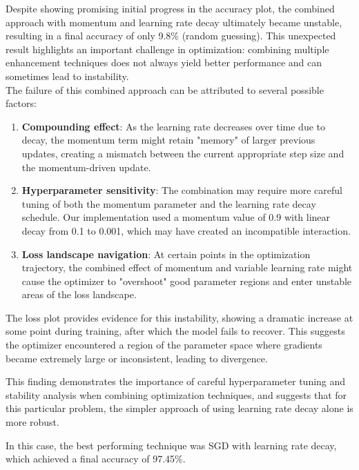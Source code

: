 \documentclass{article}
\begin{document}
\noindent Despite showing promising initial progress in the accuracy plot, the 
combined approach with momentum and learning rate decay ultimately became unstable,
resulting in a final accuracy of only 9.8\% (random guessing). 
This unexpected result highlights an important challenge in optimization: combining 
multiple enhancement techniques does not always yield better performance and can sometimes lead to instability. \\

\noindent The failure of this combined approach can be attributed to several possible factors:

\begin{enumerate}
    \item \textbf{Compounding effect}: As the learning rate decreases over time due to decay, the momentum term might retain "memory" of larger previous updates, creating a mismatch between the current appropriate step size and the momentum-driven update.
    
    \item \textbf{Hyperparameter sensitivity}: The combination may require more careful tuning of both the momentum parameter and the learning rate decay schedule. Our implementation used a momentum value of 0.9 with linear decay from 0.1 to 0.001, which may have created an incompatible interaction.
    
    \item \textbf{Loss landscape navigation}: At certain points in the optimization trajectory, the combined effect of momentum and variable learning rate might cause the optimizer to "overshoot" good parameter regions and enter unstable areas of the loss landscape.
\end{enumerate}

The loss plot provides evidence for this instability, showing a dramatic increase at some point during training, after which the model fails to recover. This suggests the optimizer encountered a region of the parameter space where gradients became extremely large or inconsistent, leading to divergence.

This finding demonstrates the importance of careful hyperparameter tuning and stability analysis when combining optimization techniques, and suggests that for this particular problem, the simpler approach of using learning rate decay alone is more robust.

In this case, the best performing technique was SGD with learning rate decay, which achieved a final accuracy of 97.45\%.
\end{document}
